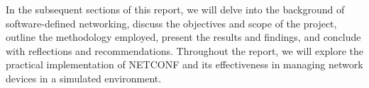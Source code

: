 In the subsequent sections of this report, we will delve into the background of software-defined networking, discuss the objectives and scope of the project, outline the methodology employed, present the results and findings, and conclude with reflections and recommendations. Throughout the report, we will explore the practical implementation of \gls{NETCONF} and its effectiveness in managing network devices in a simulated environment.











